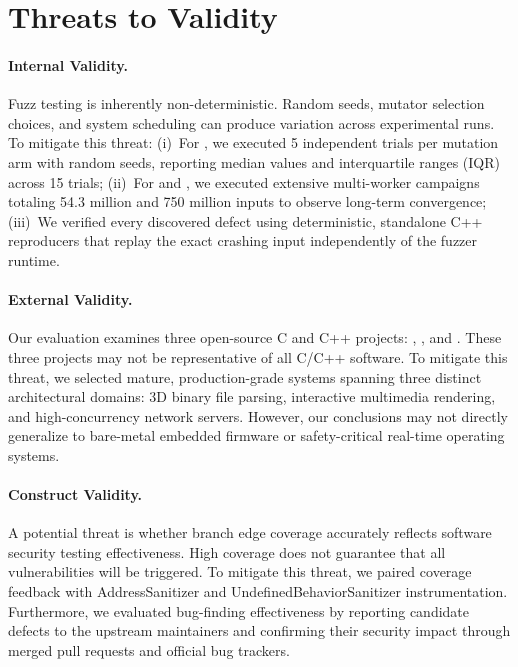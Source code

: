 \section{Threats to Validity}
\label{sec:threats}

\paragraph{Internal Validity.}
Fuzz testing is inherently non-deterministic.
Random seeds, mutator selection choices, and system scheduling can produce variation across experimental runs.
To mitigate this threat:
(i)~For \fastgltf, we executed 5 independent trials per mutation arm with random seeds, reporting median values and interquartile ranges (IQR) across 15 trials;
(ii)~For \raylib and \drogon, we executed extensive multi-worker campaigns totaling 54.3 million and 750 million inputs to observe long-term convergence;
(iii)~We verified every discovered defect using deterministic, standalone C++ reproducers that replay the exact crashing input independently of the fuzzer runtime.

\paragraph{External Validity.}
Our evaluation examines three open-source C and C++ projects: \fastgltf, \raylib, and \drogon.
These three projects may not be representative of all C/C++ software.
To mitigate this threat, we selected mature, production-grade systems spanning three distinct architectural domains: 3D binary file parsing, interactive multimedia rendering, and high-concurrency network servers.
However, our conclusions may not directly generalize to bare-metal embedded firmware or safety-critical real-time operating systems.

\paragraph{Construct Validity.}
A potential threat is whether branch edge coverage accurately reflects software security testing effectiveness.
High coverage does not guarantee that all vulnerabilities will be triggered.
To mitigate this threat, we paired coverage feedback with AddressSanitizer and UndefinedBehaviorSanitizer instrumentation.
Furthermore, we evaluated bug-finding effectiveness by reporting candidate defects to the upstream maintainers and confirming their security impact through merged pull requests and official bug trackers.

